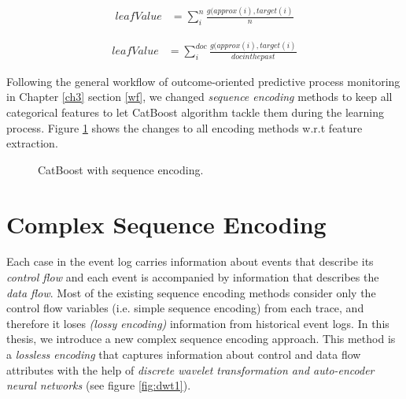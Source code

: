 \begin{equation} \label{eq1}
\begin{split}
leafValue & = \sum_{i}^{n} \frac{g(approx(i), target(i)}{n}   
\end{split}
\end{equation}

\begin{equation} \label{eq2}
\begin{split}
leafValue & = \sum_{i}^{doc} \frac{g(approx(i), target(i)}{doc in the past}   
\end{split}
\end{equation}

Following the general workflow of outcome-oriented predictive process monitoring in Chapter \ref{ch3} section \ref{wf}, we changed \textit{sequence encoding} methods to keep all categorical features  to let CatBoost algorithm tackle them during the learning process. Figure \ref{fig:cat_enc} shows the changes to all encoding methods w.r.t feature extraction.

\begin{figure}[htb]
	\begin{center}
		\caption{CatBoost with sequence encoding.}
		\label{fig:cat_enc}
	\end{center}
\end{figure}

 


\section{Complex Sequence Encoding} \label{dwt}
Each case in the event log carries information about events that describe its \textit{control flow} and each event is accompanied by information that describes the \textit{data flow}. Most of the existing sequence encoding methods consider only the control flow variables (i.e. simple sequence encoding) from each trace, and therefore it loses \textit{(lossy encoding)} information from historical event logs. In this thesis, we introduce a new complex sequence encoding approach.  This method is a \textit{lossless encoding} that captures information about control and data flow attributes with the help of \textit{discrete wavelet transformation and auto-encoder neural networks} (see figure \ref{fig:dwt1}).

